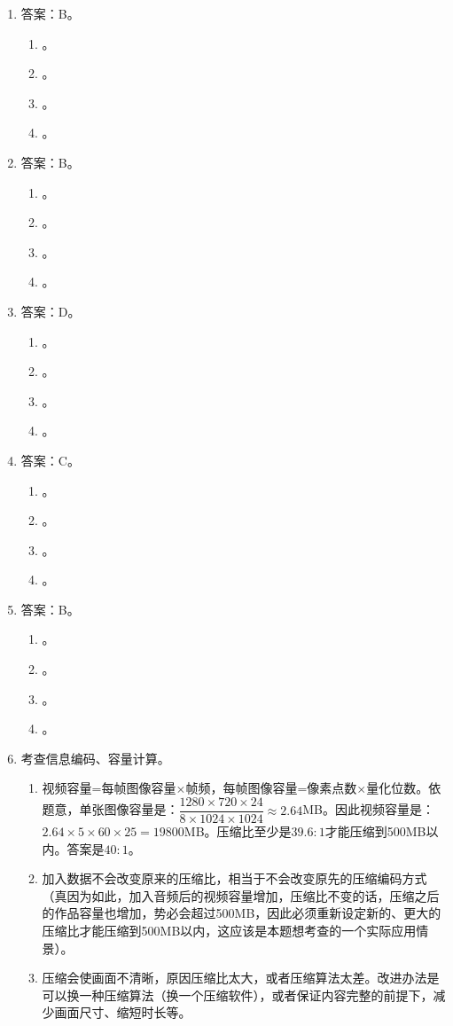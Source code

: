 \begin{enumerate}
\item 答案：B。
	\begin{enumerate}[label=\Alph*.]
	\item 。
	\item 。
	\item 。
	\item 。
	\end{enumerate}

\item 答案：B。
	\begin{enumerate}[label=\Alph*.]
	\item 。
	\item 。
	\item 。
	\item 。
	\end{enumerate}

\item 答案：D。
	\begin{enumerate}[label=\Alph*.]
	\item 。
	\item 。
	\item 。
	\item 。
	\end{enumerate}

\item 答案：C。
	\begin{enumerate}[label=\Alph*.]
	\item 。
	\item 。
	\item 。
	\item 。
	\end{enumerate}

\item 答案：B。
	\begin{enumerate}[label=\Alph*.]
	\item 。
	\item 。
	\item 。
	\item 。
	\end{enumerate}

\item 考查信息编码、容量计算。
	\begin{enumerate}[label=$(\arabic*)$]
	\item {\kaishu 视频容量=每帧图像容量$\times$帧频，每帧图像容量=像素点数$\times$量化位数}。依题意，单张图像容量是：$\dfrac{1280 \times 720 \times 24}{8 \times 1024 \times 1024} \approx 2.64$MB。因此视频容量是：$2.64 \times 5 \times 60 \times 25 = 19800$MB。压缩比至少是$39.6:1$才能压缩到500MB以内。答案是$40:1$。
	\item 加入数据不会改变原来的压缩比，相当于不会改变原先的压缩编码方式（真因为如此，加入音频后的视频容量增加，压缩比不变的话，压缩之后的作品容量也增加，势必会超过500MB，因此必须重新设定新的、更大的压缩比才能压缩到500MB以内，这应该是本题想考查的一个实际应用情景）。
	\item 压缩会使画面不清晰，原因压缩比太大，或者压缩算法太差。改进办法是可以换一种压缩算法（换一个压缩软件），或者保证内容完整的前提下，减少画面尺寸、缩短时长等。
	\end{enumerate}

\end{enumerate}


\newpage

